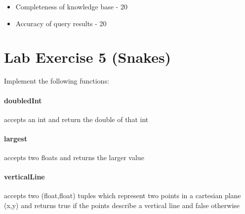 \begin{itemize}
\tightlist
\item
  Completeness of knowledge base - 20
\item
  Accuracy of query results - 20
\end{itemize}

\chapter{Lab Exercise 5
(Snakes)}\label{lab-exercise-5-snakes.md__lab-exercise-5-snakes}

Implement the following functions:

\subsubsection{doubledInt}\label{lab-exercise-5-snakes.md__doubledint}

accepts an int and return the double of that int

\begin{Shaded}
\begin{Highlighting}[]
\NormalTok{) }\OperatorTok{{-}\textgreater{}} \NormalTok{:}
\end{Highlighting}
\end{Shaded}

\subsubsection{largest}\label{lab-exercise-5-snakes.md__largest}

accepts two floats and returns the larger value

\begin{Shaded}
\begin{Highlighting}[]
\NormalTok{) }\OperatorTok{{-}\textgreater{}} \NormalTok{:}
\end{Highlighting}
\end{Shaded}

\subsubsection{verticalLine}\label{lab-exercise-5-snakes.md__verticalline}

accepts two (float,float) tuples which represent two points in a
cartesian plane (x,y) and returns true if the points describe a vertical
line and false otherwise


